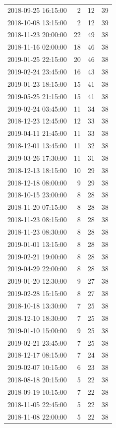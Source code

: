 \begin{tabular}{lrrr}
2018-09-25 16:15:00 & 2 & 12 & 39 \\
2018-10-08 13:15:00 & 2 & 12 & 39 \\
2018-11-23 20:00:00 & 22 & 49 & 38 \\
2018-11-16 02:00:00 & 18 & 46 & 38 \\
2019-01-25 22:15:00 & 20 & 46 & 38 \\
2019-02-24 23:45:00 & 16 & 43 & 38 \\
2019-01-23 18:15:00 & 15 & 41 & 38 \\
2019-05-25 21:15:00 & 15 & 41 & 38 \\
2019-02-24 03:45:00 & 11 & 34 & 38 \\
2018-12-23 12:45:00 & 12 & 33 & 38 \\
2019-04-11 21:45:00 & 11 & 33 & 38 \\
2018-12-01 13:45:00 & 11 & 32 & 38 \\
2019-03-26 17:30:00 & 11 & 31 & 38 \\
2018-12-13 18:15:00 & 10 & 29 & 38 \\
2018-12-18 08:00:00 & 9 & 29 & 38 \\
2018-10-15 23:00:00 & 8 & 28 & 38 \\
2018-11-20 07:15:00 & 8 & 28 & 38 \\
2018-11-23 08:15:00 & 8 & 28 & 38 \\
2018-11-23 08:30:00 & 8 & 28 & 38 \\
2019-01-01 13:15:00 & 8 & 28 & 38 \\
2019-02-21 19:00:00 & 8 & 28 & 38 \\
2019-04-29 22:00:00 & 8 & 28 & 38 \\
2019-01-20 12:30:00 & 9 & 27 & 38 \\
2019-02-28 15:15:00 & 8 & 27 & 38 \\
2018-10-18 13:30:00 & 7 & 25 & 38 \\
2018-12-10 18:30:00 & 7 & 25 & 38 \\
2019-01-10 15:00:00 & 9 & 25 & 38 \\
2019-02-21 23:45:00 & 7 & 25 & 38 \\
2018-12-17 08:15:00 & 7 & 24 & 38 \\
2019-02-07 10:15:00 & 6 & 23 & 38 \\
2018-08-18 20:15:00 & 5 & 22 & 38 \\
2018-09-19 10:15:00 & 7 & 22 & 38 \\
2018-11-05 22:45:00 & 5 & 22 & 38 \\
2018-11-08 22:00:00 & 5 & 22 & 38 \\

\end{tabular}
